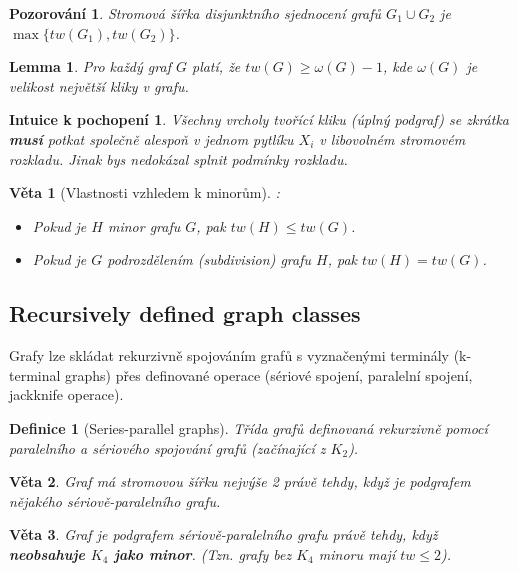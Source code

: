 \documentclass[a4paper,11pt]{article}
\newtheorem{definition}{Definice}[section]
\newtheorem{theorem}{Věta}[section]
\newtheorem{lemma}{Lemma}[section]
\newtheorem{observation}{Pozorování}[section]
\newtheorem*{intuition}{Intuice k pochopení}
\begin{document}
\begin{observation}
Stromová šířka disjunktního sjednocení grafů $G_1 \cup G_2$ je $\max\{tw(G_1), tw(G_2)\}$.
\end{observation}

\begin{lemma}
Pro každý graf $G$ platí, že $tw(G) \ge \omega(G) - 1$, kde $\omega(G)$ je velikost největší kliky v grafu.
\end{lemma}

\begin{intuition}
Všechny vrcholy tvořící kliku (úplný podgraf) se zkrátka \textbf{musí} potkat společně alespoň v jednom pytlíku $X_i$ v libovolném stromovém rozkladu. Jinak bys nedokázal splnit podmínky rozkladu.
\end{intuition}

\begin{theorem}[Vlastnosti vzhledem k minorům]:
\begin{itemize}
    \item Pokud je $H$ minor grafu $G$, pak $tw(H) \le tw(G)$.
    \item Pokud je $G$ podrozdělením (subdivision) grafu $H$, pak $tw(H) = tw(G)$.
\end{itemize}
\end{theorem}

\subsection{Recursively defined graph classes}

Grafy lze skládat rekurzivně spojováním grafů s vyznačenými terminály (k-terminal graphs) přes definované operace (sériové spojení, paralelní spojení, jackknife operace).

\begin{definition}[Series-parallel graphs]
Třída grafů definovaná rekurzivně pomocí paralelního a sériového spojování grafů (začínající z $K_2$).
\end{definition}

\begin{theorem}
Graf má stromovou šířku nejvýše 2 právě tehdy, když je podgrafem nějakého sériově-paralelního grafu.
\end{theorem}

\begin{theorem}
Graf je podgrafem sériově-paralelního grafu právě tehdy, když \textbf{neobsahuje $K_4$ jako minor}. (Tzn. grafy bez $K_4$ minoru mají $tw \le 2$).
\end{theorem}
\end{document}
